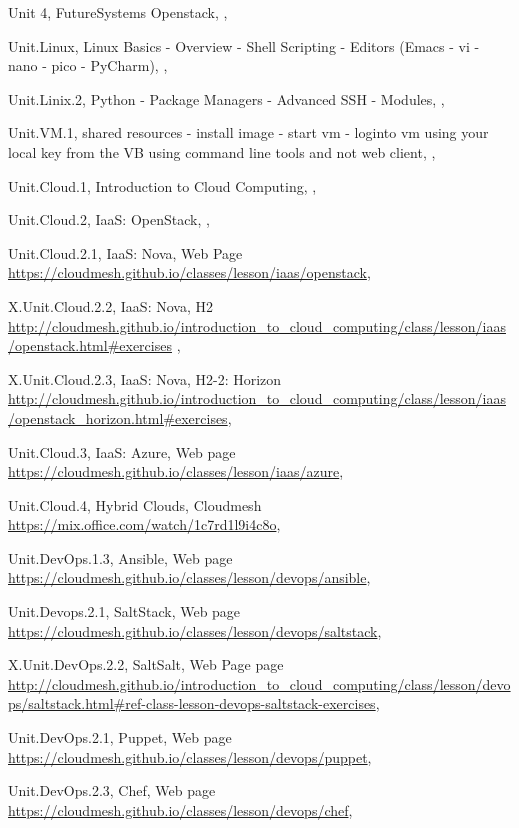 Unit 4, FutureSystems Openstack, , 


Unit.Linux, Linux Basics - Overview - Shell Scripting -  Editors (Emacs - vi - nano - pico - PyCharm), ,

Unit.Linix.2, Python - Package Managers - Advanced SSH - Modules, ,

Unit.VM.1, shared resources - install image -  start vm -  loginto vm using your local key from the VB using command line tools and not web client, ,

Unit.Cloud.1, Introduction to Cloud Computing, , 

Unit.Cloud.2, IaaS: OpenStack, ,

Unit.Cloud.2.1, IaaS: Nova, Web Page \url{https://cloudmesh.github.io/classes/lesson/iaas/openstack},

X.Unit.Cloud.2.2, IaaS: Nova, H2 \url{http://cloudmesh.github.io/introduction_to_cloud_computing/class/lesson/iaas/openstack.html#exercises} ,

X.Unit.Cloud.2.3, IaaS: Nova, H2-2: Horizon \url{http://cloudmesh.github.io/introduction_to_cloud_computing/class/lesson/iaas/openstack_horizon.html#exercises},

Unit.Cloud.3, IaaS: Azure, Web page \url{https://cloudmesh.github.io/classes/lesson/iaas/azure},  

Unit.Cloud.4, Hybrid Clouds, Cloudmesh \url{https://mix.office.com/watch/1c7rd1l9i4c8o},

Unit.DevOps.1.3, Ansible, Web page \url{https://cloudmesh.github.io/classes/lesson/devops/ansible},

Unit.Devops.2.1, SaltStack, Web page \url{https://cloudmesh.github.io/classes/lesson/devops/saltstack}, 

X.Unit.DevOps.2.2, SaltSalt, Web Page page \url{http://cloudmesh.github.io/introduction_to_cloud_computing/class/lesson/devops/saltstack.html#ref-class-lesson-devops-saltstack-exercises}, 

Unit.DevOps.2.1, Puppet, Web page \url{https://cloudmesh.github.io/classes/lesson/devops/puppet}, 


Unit.DevOps.2.3, Chef, Web page \url{https://cloudmesh.github.io/classes/lesson/devops/chef}, 


